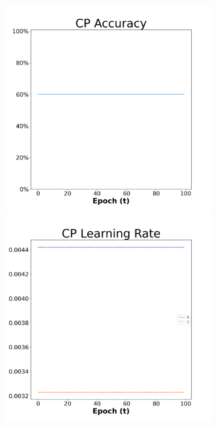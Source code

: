 \begin{figure}[H]
  \centering %
\begin{subfigure}{0.3\textwidth}
\includegraphics[width=\linewidth]{images/exper1/NSP/CP_0.01_acc.png}
  \includegraphics[width=\linewidth]{images/exper1/NSP/CP_0.01_lr.png}

\end{subfigure}
\end{figure}
